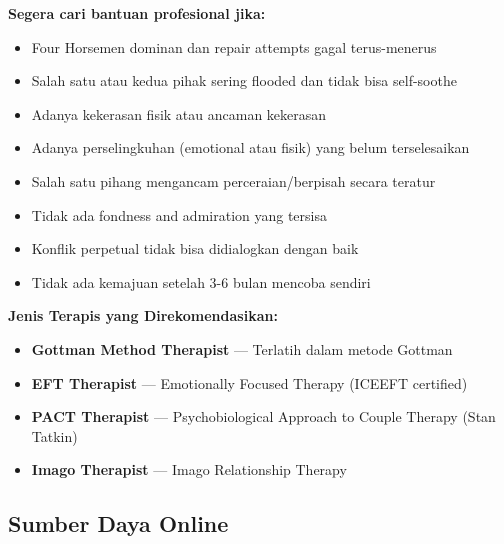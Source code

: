 \begin{warningbox}
\textbf{Segera cari bantuan profesional jika:}
\begin{itemize}[itemsep=0.15cm]
    \item[$\square$] Four Horsemen dominan dan repair attempts gagal terus-menerus
    \item[$\square$] Salah satu atau kedua pihak sering flooded dan tidak bisa self-soothe
    \item[$\square$] Adanya kekerasan fisik atau ancaman kekerasan
    \item[$\square$] Adanya perselingkuhan (emotional atau fisik) yang belum terselesaikan
    \item[$\square$] Salah satu pihang mengancam perceraian/berpisah secara teratur
    \item[$\square$] Tidak ada fondness and admiration yang tersisa
    \item[$\square$] Konflik perpetual tidak bisa didialogkan dengan baik
    \item[$\square$] Tidak ada kemajuan setelah 3-6 bulan mencoba sendiri
\end{itemize}

\textbf{Jenis Terapis yang Direkomendasikan:}
\begin{itemize}[itemsep=0.1cm]
    \item \textbf{Gottman Method Therapist} --- Terlatih dalam metode Gottman
    \item \textbf{EFT Therapist} --- Emotionally Focused Therapy (ICEEFT certified)
    \item \textbf{PACT Therapist} --- Psychobiological Approach to Couple Therapy (Stan Tatkin)
    \item \textbf{Imago Therapist} --- Imago Relationship Therapy
\end{itemize}
\end{warningbox}

\subsection{Sumber Daya Online}


